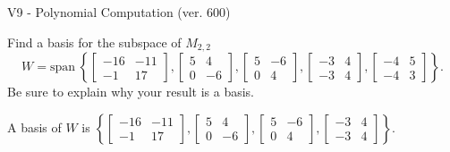 \begin{exercise}
  \begin{exerciseTitle}V9 - Polynomial Computation (ver. 600)\end{exerciseTitle}
  \begin{exerciseStatement}
    Find a basis for the subspace of \(M_{2,2}\) 
\[W=\mathrm{span}\ \left\{\left[\begin{array}{cc}
-16 & -11 \\
-1 & 17
\end{array}\right] , \left[\begin{array}{cc}
5 & 4 \\
0 & -6
\end{array}\right] , \left[\begin{array}{cc}
5 & -6 \\
0 & 4
\end{array}\right] , \left[\begin{array}{cc}
-3 & 4 \\
-3 & 4
\end{array}\right] , \left[\begin{array}{cc}
-4 & 5 \\
-4 & 3
\end{array}\right]\right\}.\]
 Be sure to explain why your result is a basis.


  \end{exerciseStatement}
  \begin{exerciseAnswer}
   A basis of \(W\) is  \(\left\{\left[\begin{array}{cc}
-16 & -11 \\
-1 & 17
\end{array}\right] , \left[\begin{array}{cc}
5 & 4 \\
0 & -6
\end{array}\right] , \left[\begin{array}{cc}
5 & -6 \\
0 & 4
\end{array}\right] , \left[\begin{array}{cc}
-3 & 4 \\
-3 & 4
\end{array}\right]\right\}\).
  


  \end{exerciseAnswer}
\end{exercise}